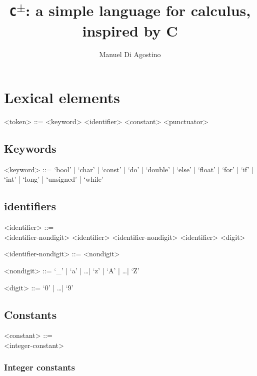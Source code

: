 \documentclass[a4paper]{article}
\title{\Huge{\texttt{C\textsuperscript{$\pm$}}: a simple language for calculus, inspired by C}}
\author{Manuel Di Agostino}
\begin{document}
\maketitle

\section{Lexical elements}
\begin{grammar}

	<token> ::= <keyword>
		\alt <identifier>
		\alt <constant>
		\alt <string-literal>
		\alt <punctuator>
	
\end{grammar}

\subsection{Keywords}

\begin{grammar}
	<keyword> ::=  `bool' | `char' | `const' | `do' | `double' | `else' | `float' | `for' | `if' | `int' | `long' | `unsigned' | `while'
\end{grammar}

\subsection{identifiers}

\begin{grammar}
	<identifier> ::= \hfill \\
		<identifier-nondigit>
		\alt <identifier> <identifier-nondigit>
		\alt <identifier> <digit>

	<identifier-nondigit> ::= <nondigit>

	<nondigit> ::= `_' | `a' | \dots | `z' | `A' | \dots | `Z'

	<digit> ::= `0' | \dots | `9'
\end{grammar}

\subsection{Constants}

\begin{grammar}
	<constant> ::= \hfill \\
		<integer-constant>
		\alt <floating-constant>
		\alt <character-constant>
\end{grammar}

\subsubsection{Integer constants}
\end{document}
